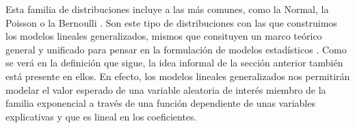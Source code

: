 
Esta familia de distribuciones incluye a las más comunes, como la Normal, la Poisson o la Bernoulli \parencite[52-53]{Nieto16}. Son este tipo de distribuciones con las que construimos los modelos lineales generalizados, mismos que consituyen un marco teórico general y unificado para pensar en la formulación de modelos estadísticos \parencites{Dobson01}{Regueiro12}. Como se verá en la definición que sigue, la idea informal de la sección anterior también está presente en ellos. En efecto, los modelos lineales generalizados nos permitirán modelar el valor esperado de una variable aleatoria de interés miembro de la familia exponencial a través de una función dependiente de unas variables explicativas y que es lineal en los coeficientes.

